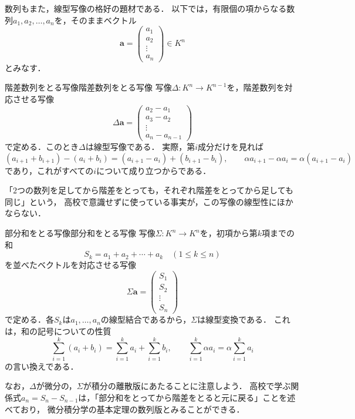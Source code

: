 数列もまた，線型写像の格好の題材である．
以下では，有限個の項からなる数列$a_1, a_2, \dots, a_n$を，そのままベクトル
\[
  \bm{a} = \begin{pmatrix} a_1 \\ a_2 \\ \vdots \\ a_n \end{pmatrix} \in K^n
\]
とみなす．

\begin{example}{階差数列をとる写像}{階差数列をとる写像}
  写像$\Delta \colon K^n \to K^{n-1}$を，階差数列を対応させる写像
  \[
    \Delta \bm{a} =
    \begin{pmatrix}
      a_2 - a_1 \\ a_3 - a_2 \\ \vdots \\ a_n - a_{n-1}
    \end{pmatrix}
  \]
  で定める．このとき$\Delta$は線型写像である．
  実際，第$i$成分だけを見れば
  \[
    (a_{i+1} + b_{i+1}) - (a_i + b_i) = (a_{i+1} - a_i) + (b_{i+1} - b_i), \qquad
    \alpha a_{i+1} - \alpha a_i = \alpha (a_{i+1} - a_i)
  \]
  であり，これがすべての$i$について成り立つからである．

  「$2$つの数列を足してから階差をとっても，それぞれ階差をとってから足しても同じ」という，
  高校で意識せずに使っている事実が，この写像の線型性にほかならない．
\end{example}

\begin{example}{部分和をとる写像}{部分和をとる写像}
  写像$\Sigma \colon K^n \to K^n$を，初項から第$k$項までの和
  \[
    S_k = a_1 + a_2 + \cdots + a_k \quad (1 \le k \le n)
  \]
  を並べたベクトルを対応させる写像
  \[
    \Sigma \bm{a} = \begin{pmatrix} S_1 \\ S_2 \\ \vdots \\ S_n \end{pmatrix}
  \]
  で定める．各$S_k$は$a_1, \dots, a_n$の線型結合であるから，$\Sigma$は線型変換である．
  これは，和の記号についての性質
  \[
    \sum_{i=1}^{k} (a_i + b_i) = \sum_{i=1}^{k} a_i + \sum_{i=1}^{k} b_i, \qquad
    \sum_{i=1}^{k} \alpha a_i = \alpha \sum_{i=1}^{k} a_i
  \]
  の言い換えである．

  なお，$\Delta$が微分の，$\Sigma$が積分の離散版にあたることに注意しよう．
  高校で学ぶ関係式$a_n = S_n - S_{n-1}$は，「部分和をとってから階差をとると元に戻る」ことを述べており，
  微分積分学の基本定理の数列版とみることができる．
\end{example}

